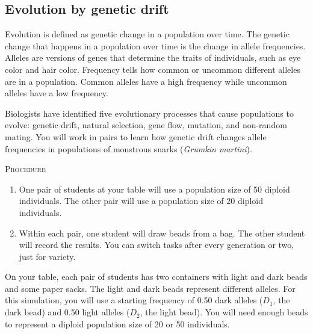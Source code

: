 \documentclass[12pt]{exam}
\begin{document}
\subsection*{Evolution by genetic drift}

Evolution is defined as genetic change in a population over time. 
The genetic change that happens in a population over time is the change 
in allele frequencies. Alleles are versions of genes that determine the 
traits of individuals, such as eye color and hair color. Frequency tells 
how common or uncommon different alleles are in a population. Common 
alleles have a high frequency while uncommon alleles have a low frequency.  

Biologists have identified five evolutionary processes that cause 
populations to evolve: genetic drift, natural selection, gene flow, 
mutation, and non-random mating. You will work in pairs to learn how 
genetic drift changes allele frequencies in populations of monstrous snarks
(\textit{Grumkin martini}). 

\bigskip

\textsc{Procedure}

\medskip

\begin{enumerate}
	\item One pair of students at your table will use a population size of 
	50 diploid individuals. The other pair will use a population size of 20
	diploid individuals. 
	
	\item Within each pair, one student will draw beads from a bag. The other
	student will record the results. You can switch tasks after every 
	generation or two, just for variety.
	
\end{enumerate}

On your table, each pair of students has two containers with light and dark beads and some 
paper sacks. The light and dark beads represent different alleles. For this 
simulation, you will use a starting frequency of 0.50 dark alleles ($D_1$, the dark 
bead) and 0.50 light alleles ($D_2$, the light bead). You will need enough beads 
to represent a diploid population size of 20 or 50 individuals.
\end{document}
